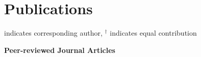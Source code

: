 \documentclass[../main.tex]{subfiles}
\begin{document}

\section{Publications} 
  \vspace{2pt}
  \resumeSubHeadingListStart
    \item
        \small \normalfont * indicates corresponding author, {$^\dagger$ indicates equal contribution}
    \item
        \textbf{Peer-reviewed Journal Articles}  
        \def\labelprefix{J}
\end{document}

